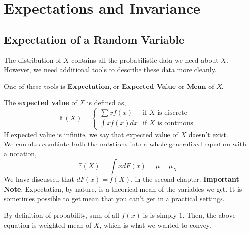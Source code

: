\chapter{Expectations and Invariance}
\section{Expectation of a Random Variable}
The distribution of $X$ contains all the probabilistic data we need about $X$. However, we need additional tools to describe these data more cleanly. 
\par
One of these tools is \textbf{Expectation}, or \textbf{Expected Value} or \textbf{Mean} of $X$.
\begin{definition}
    The \textbf{expected value} of $X$ is defined as,
    \[\mathbb{E}(X)= \begin{cases}
        \sum xf(x)& \text{if $X$ is discrete} \\
        \int xf(x)dx &\text{if $X$ is continous}
    \end{cases}\]
    If expected value is infinite, we say that expected value of $X$ doesn't exist.\\
    We can also combinte both the notations into a whole generalized equation with a notation,
    \[\mathbb{E}(X) = \int x dF(x)= \mu = \mu_X\]
    We have discussed that $dF(x) = f(X)$. in the second chapter.
    \textbf{Important Note}. Expectation, by nature, is a theorical mean of the variables we get. It is sometimes possible to get mean that you can't get in a practical settings.
\end{definition}
By definition of probability, sum of all $f(x)$ is is simply $1$. Then, the above equation is weighted mean of $X$, which is what we wanted to convey.


